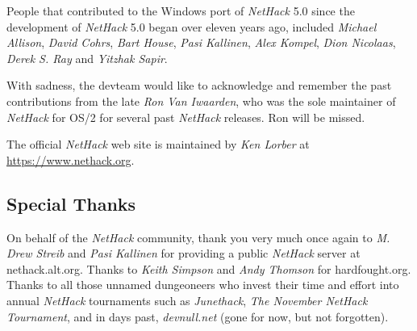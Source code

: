 \documentclass[titlepage]{article}
\begin{document}
\medskip
People that contributed to the Windows port of \textit{NetHack} 5.0 since the
development of \textit{NetHack} 5.0 began over eleven years ago, included
\textit{Michael Allison}, \textit{David Cohrs}, \textit{Bart House},
\textit{Pasi Kallinen}, \textit{Alex Kompel}, \textit{Dion Nicolaas},
\textit{Derek S. Ray} and \textit{Yitzhak Sapir}.

\medskip
With sadness, the devteam would like to acknowledge and remember the past
contributions from the late \textit{Ron Van Iwaarden}, who was the sole maintainer
of \textit{NetHack} for OS/2 for several past \textit{NetHack} releases. Ron will be missed.

\medskip
\noindent The official \textit{NetHack} web site is maintained by \textit{Ken Lorber} at
\url{https://www.nethack.org}.


\subsection*{Special Thanks}
\noindent On behalf of the \textit{NetHack} community, thank you very much once
again to \textit{M. Drew Streib} and \textit{Pasi Kallinen} for providing a
public \textit{NetHack} server at nethack.alt.org. Thanks to \textit{Keith Simpson}
and \textit{Andy Thomson} for hardfought.org. Thanks to all those
unnamed dungeoneers who invest their time and effort into annual
\textit{NetHack} tournaments such as \textit{Junethack},
\textit{The November NetHack Tournament}, and in days past,
\textit{devnull.net} (gone for now, but not forgotten).
\clearpage

\end{document}

